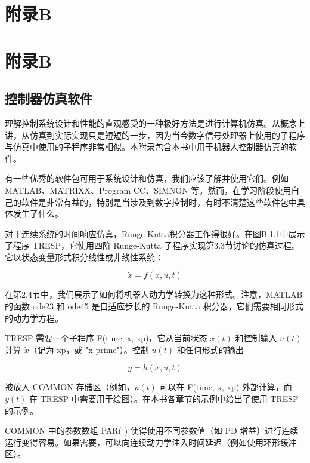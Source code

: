 \documentclass[UTF8]{ctexart}
\begin{document}
  \section*{附录B}
\fi

\ifstandalone
\else
  \section*{附录B}
\fi

\subsection*{控制器仿真软件}

理解控制系统设计和性能的直观感受的一种极好方法是进行计算机仿真。从概念上讲，从仿真到实际实现只是短短的一步，因为当今数字信号处理器上使用的子程序与仿真中使用的子程序非常相似。本附录包含本书中用于机器人控制器仿真的软件。

有一些优秀的软件包可用于系统设计和仿真，我们应该了解并使用它们。例如 MATLAB、MATRIXX、Program CC、SIMNON 等。然而，在学习阶段使用自己的软件是非常有益的，特别是当涉及到数字控制时，有时不清楚这些软件包中具体发生了什么。

对于连续系统的时间响应仿真，Runge-Kutta积分器工作得很好。在图B.1.1中展示了程序 TRESP，它使用四阶 Runge-Kutta 子程序实现第3.3节讨论的仿真过程。它以状态变量形式积分线性或非线性系统：

\begin{equation}\label{eq:B.1}
\dot{x} = f(x, u, t)
\tag{B.1}
\end{equation}

在第2.4节中，我们展示了如何将机器人动力学转换为这种形式。注意，MATLAB 的函数 ode23 和 ode45 是自适应步长的 Runge-Kutta 积分器，它们需要相同形式的动力学方程。

TRESP 需要一个子程序 F(time, x, xp)，它从当前状态 $x(t)$ 和控制输入 $u(t)$ 计算 $\dot{x}$（记为 xp，或 "x prime"）。控制 $u(t)$ 和任何形式的输出

\begin{equation}\label{eq:B.2}
y = h(x, u, t)
\tag{B.2}
\end{equation}

被放入 COMMON 存储区（例如，$u(t)$ 可以在 F(time, x, xp) 外部计算，而 $y(t)$ 在 TRESP 中需要用于绘图）。在本书各章节的示例中给出了使用 TRESP 的示例。

COMMON 中的参数数组 PAR( ) 使得使用不同参数值（如 PD 增益）进行连续运行变得容易。如果需要，可以向连续动力学注入时间延迟（例如使用环形缓冲区）。
\end{document}
